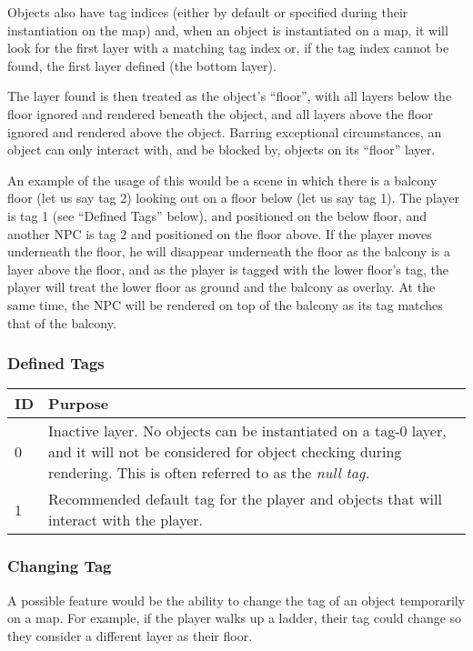 \documentclass [12pt,a4paper]{article}
\begin{document}
Objects also have tag indices (either by default or specified during
their instantiation on the map) and, when an object is instantiated on
a map, it will look for the first layer with a matching tag index or,
if the tag index cannot be found, the first layer defined (the bottom
layer).

The layer found is then treated as the object's ``floor'', with all
layers below the floor ignored and rendered beneath the object, and
all layers above the floor ignored and rendered above the object.
Barring exceptional circumstances, an object can only interact with,
and be blocked by, objects on its ``floor'' layer.

An example of the usage of this would be a scene in which there is a
balcony floor (let us say tag 2) looking out on a floor below (let us
say tag 1).  The player is tag 1 (see ``Defined Tags'' below), and
positioned on the below floor, and another NPC is tag 2 and positioned
on the floor above.  If the player moves underneath the floor, he will
disappear underneath the floor as the balcony is a layer above the
floor, and as the player is tagged with the lower floor's tag, the
player will treat the lower floor as ground and the balcony as
overlay.  At the same time, the NPC will be rendered on top of the
balcony as its tag matches that of the balcony.

\subsubsection{Defined Tags}

\begin{tabular}{ l p{5in} }
  ID & Purpose \\
  \hline
  0  & Inactive layer.  No objects can be instantiated on a tag-0
       layer, and it will not be considered for object checking during 
       rendering.  This is often referred to as the \emph{null tag.} \\
  1  & Recommended default tag for the player and objects that will 
       interact with the player. \\
\end{tabular}

\subsubsection{Changing Tag}

A possible feature would be the ability to change the tag of an object
temporarily on a map.  For example, if the player walks up a ladder,
their tag could change so they consider a different layer as their
floor.
\end{document}
